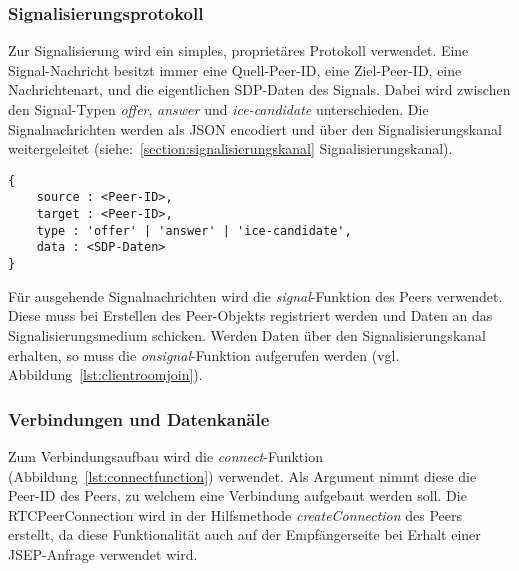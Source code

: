 \subsubsection{Signalisierungsprotokoll}
Zur Signalisierung wird ein simples, proprietäres Protokoll verwendet. Eine Signal-Nachricht besitzt immer eine Quell-Peer-ID, eine Ziel-Peer-ID, eine Nachrichtenart, und die eigentlichen \acs{SDP}-Daten des Signals. Dabei wird zwischen den Signal-Typen \textit{offer}, \textit{answer} und \textit{ice-candidate} unterschieden. Die Signalnachrichten werden als \acs{JSON} encodiert und über den Signalisierungskanal weitergeleitet (siehe:~\ref{section:signalisierungskanal} Signalisierungskanal).\par

\vspace{5pt}
\lstset{language=js, style=STYLE_CODE_JS}
\begin{singlespace}
\begin{lstlisting}[caption={Format des Signalisierungsprotokolls}, captionpos=b, label={lst:protocoll}]
{
    source : <Peer-ID>,
    target : <Peer-ID>,
    type : 'offer' | 'answer' | 'ice-candidate',
    data : <SDP-Daten>
}
\end{lstlisting}
\end{singlespace}

Für ausgehende Signalnachrichten wird die \textit{signal}-Funktion des Peers verwendet. Diese muss bei Erstellen des Peer-Objekts registriert werden und Daten an das Signalisierungsmedium schicken. Werden Daten über den Signalisierungskanal erhalten, so muss die \textit{onsignal}-Funktion aufgerufen werden (vgl. Abbildung~\ref{lst:clientroomjoin}).

\subsubsection{Verbindungen und Datenkanäle}
Zum Verbindungsaufbau wird die \textit{connect}-Funktion (Abbildung~\ref{lst:connectfunction}) verwendet. Als Argument nimmt diese die Peer-ID des Peers, zu welchem eine Verbindung aufgebaut werden soll. Die RTCPeerConnection wird in der Hilfsmethode \textit{createConnection} des Peers erstellt, da diese Funktionalität auch auf der Empfängerseite bei Erhalt einer \acs{JSEP}-Anfrage verwendet wird.\par

